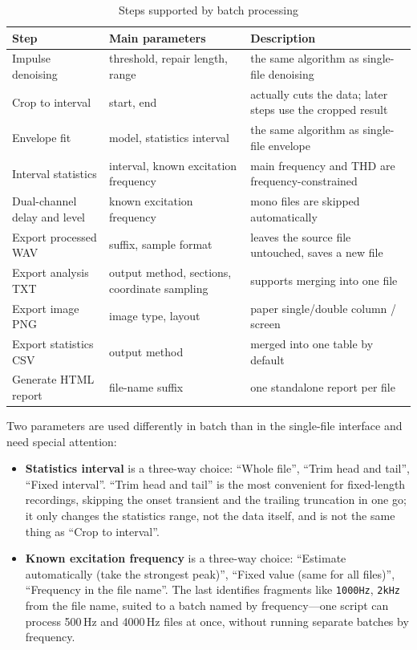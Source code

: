 \documentclass[UTF8,a4paper,12pt]{ctexart}
\begin{document}
\begin{table}[htbp]
\centering
\caption{Steps supported by batch processing}
{\small
\begin{tabular}{@{}>{\raggedright\arraybackslash}p{4.0cm}>{\raggedright\arraybackslash}p{4.6cm}>{\raggedright\arraybackslash}p{5.4cm}@{}}
\toprule
Step & Main parameters & Description \\
\midrule
Impulse denoising & threshold, repair length, range & the same algorithm as single-file denoising \\
Crop to interval & start, end & actually cuts the data; later steps use the cropped result \\
Envelope fit & model, statistics interval & the same algorithm as single-file envelope \\
Interval statistics & interval, known excitation frequency & main frequency and THD are frequency-constrained \\
Dual-channel delay and level & known excitation frequency & mono files are skipped automatically \\
Export processed WAV & suffix, sample format & leaves the source file untouched, saves a new file \\
Export analysis TXT & output method, sections, coordinate sampling & supports merging into one file \\
Export image PNG & image type, layout & paper single/double column / screen \\
Export statistics CSV & output method & merged into one table by default \\
Generate HTML report & file-name suffix & one standalone report per file \\
\bottomrule
\end{tabular}}
\label{tab:batch_steps}
\end{table}

Two parameters are used differently in batch than in the single-file interface and need special attention:

\begin{itemize}
  \item \textbf{Statistics interval} is a three-way choice: ``Whole file'', ``Trim head and tail'', ``Fixed interval''. ``Trim head and tail'' is the most convenient for fixed-length recordings, skipping the onset transient and the trailing truncation in one go; it only changes the statistics range, not the data itself, and is not the same thing as ``Crop to interval''.
  \item \textbf{Known excitation frequency} is a three-way choice: ``Estimate automatically (take the strongest peak)'', ``Fixed value (same for all files)'', ``Frequency in the file name''. The last identifies fragments like \texttt{1000Hz}, \texttt{2kHz} from the file name, suited to a batch named by frequency---one script can process 500\,Hz and 4000\,Hz files at once, without running separate batches by frequency.
\end{itemize}
\end{document}
